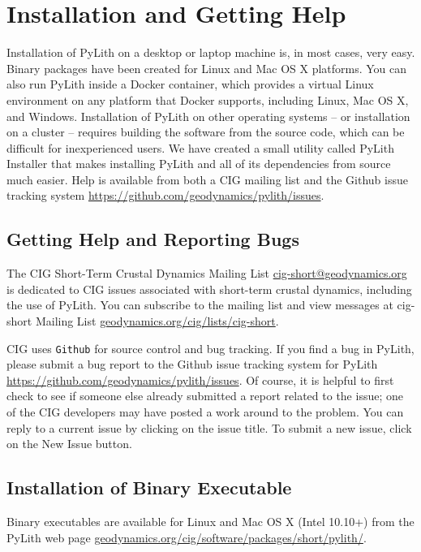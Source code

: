 
\chapter{\label{cha:Installation-and-Getting}Installation and Getting Help}

Installation of PyLith on a desktop or laptop machine is, in most
cases, very easy. Binary packages have been created for Linux and
Mac OS X platforms. You can also run PyLith inside a Docker container,
which provides a virtual Linux environment on any platform that Docker
supports, including Linux, Mac OS X, and Windows. Installation of
PyLith on other operating systems -- or installation on a cluster
-- requires building the software from the source code, which can
be difficult for inexperienced users. We have created a small utility
called PyLith Installer that makes installing PyLith and all of its
dependencies from source much easier. Help is available from both
a CIG mailing list and the Github issue tracking system \url{https://github.com/geodynamics/pylith/issues}.


\section{\label{sec:Getting-Help-and}Getting Help and Reporting Bugs}

The CIG Short-Term Crustal Dynamics Mailing List \url{cig-short@geodynamics.org}
is dedicated to CIG issues associated with short-term crustal dynamics,
including the use of PyLith. You can subscribe to the mailing list
and view messages at cig-short Mailing List \url{geodynamics.org/cig/lists/cig-short}. 

CIG uses \texttt{Github} for source control and bug tracking. If you
find a bug in PyLith, please submit a bug report to the Github issue
tracking system for PyLith \url{https://github.com/geodynamics/pylith/issues}.
Of course, it is helpful to first check to see if someone else already
submitted a report related to the issue; one of the CIG developers
may have posted a work around to the problem. You can reply to a current
issue by clicking on the issue title. To submit a new issue, click
on the \textsf{New Issue} button.


\section{Installation of Binary Executable}

Binary executables are available for Linux and Mac OS X (Intel 10.10+)
from the PyLith web page \url{geodynamics.org/cig/software/packages/short/pylith/}.


